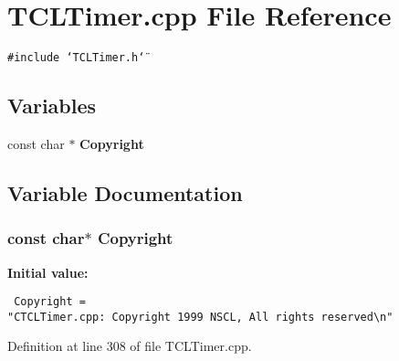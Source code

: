 \section{TCLTimer.cpp File Reference}
\label{TCLTimer_8cpp}
{\tt \#include \char`\"{}TCLTimer.h\char`\"{}}\par
\subsection*{Variables}
\begin{CompactItemize}
\item 
const char $\ast$ {\bf Copyright}
\end{CompactItemize}


\subsection{Variable Documentation}
\subsubsection{\setlength{\rightskip}{0pt plus 5cm}const char$\ast$ Copyright\hspace{0.3cm}{\tt  [static]}}\label{TCLTimer_8cpp_a0}


{\bf Initial value:}

\footnotesize\begin{verbatim} Copyright = 
"CTCLTimer.cpp: Copyright 1999 NSCL, All rights reserved\n"\end{verbatim}\normalsize 


Definition at line 308 of file TCLTimer.cpp.